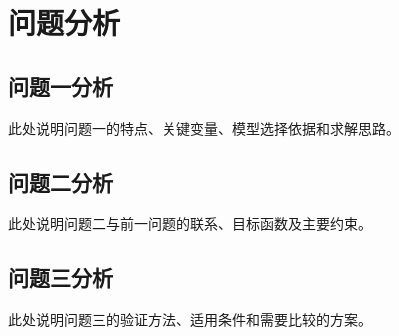\section{问题分析}
\subsection{问题一分析}
此处说明问题一的特点、关键变量、模型选择依据和求解思路。

\subsection{问题二分析}
此处说明问题二与前一问题的联系、目标函数及主要约束。

\subsection{问题三分析}
此处说明问题三的验证方法、适用条件和需要比较的方案。
